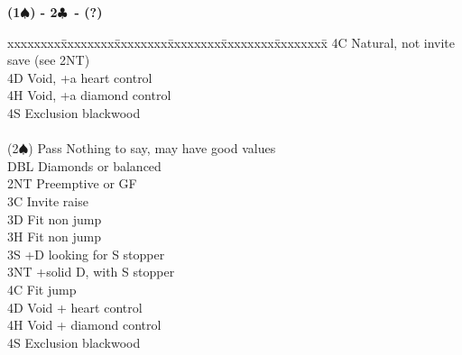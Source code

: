 \documentclass[10pt]{article}
\renewcommand{\c}{$\clubsuit$}
\newcommand{\s}{$\spadesuit$}
\newenvironment{bidtable}[1][]
{\textbf{#1}
  \begin{adjustwidth}{1em}{}
    \addvspace{2pt}
    \begin{tabbing}
      xxxxxxxx\=xxxxxxxx\=xxxxxxxx\=xxxxxxxx\=xxxxxxxx\=xxxxxxxx\=\kill}
{\end{tabbing}\end{adjustwidth}\bigskip}%
\begin{document}
\begin{multicols*}{2}
\begin{bidtable}[(1\s) - 2\c\ - (?)]
       \> 4C   \> Natural, not invite save (see 2NT)             \\
       \> 4D   \> Void, +a heart control                         \\
       \> 4H   \> Void, +a diamond control                       \\
       \> 4S   \> Exclusion blackwood                            \\
                                                                 \\
(2\s)  \> Pass \> Nothing to say, may have good values           \\
       \> DBL  \> Diamonds or balanced                           \\
       \> 2NT  \> Preemptive or GF                               \\
       \> 3C   \> Invite raise                                   \\
       \> 3D   \> Fit non jump                                   \\
       \> 3H   \> Fit non jump                                   \\
       \> 3S   +D looking for S stopper                      \\
       \> 3NT  +solid D, with S stopper                      \\
       \> 4C   \> Fit jump                                       \\
       \> 4D   \> Void + heart control                           \\
       \> 4H   \> Void + diamond control                         \\
       \> 4S   \> Exclusion blackwood

\end{bidtable}


\end{multicols*}
\end{document}
